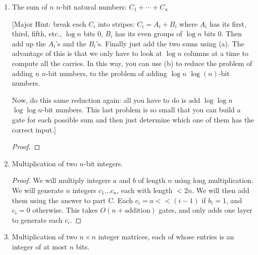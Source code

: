 \documentclass[12pt]{article}
\begin{document}
\begin{enumerate}
\begin{enumerate}
\begin{proof}
      Our second layer again has $n$ gates, $b_1...b_n$. Gate $b_i$ will be on if gate $a_i$ is on and $a_{i+1}$ is not on. There will be only one gate on at this level, $b_k$, where $k$ is the number of 1s in the input.

      Our final layer, $c_1...c_{\log{n}}$ will conver the number $k$ from $b_k$ to a binary value. Let $c_i=1$ if there is a $1$ in the $i^{\text{th}}$ position of $b_i$ and $b_i=1$. This takes a bunch of wires, but only a logarithmic number of gates.
    \end{proof}

  \item The sum of $n$ $n$-bit natural numbers: $C_1 + \cdots + C_n$

    [Major Hint: break each $C_i$ into stripes: $C_i = A_i + B_i$ where $A_i$
      has its first, third, fifth, etc.,  $\log n$ bits 0, $B_i$ has its even
      groups of $\log n$ bits 0.  Then add up the $A_i$'s and the
      $B_i$'s.  Finally just add the two sums using (a). The advantage of this is
      that we only have to look at $\log n$ columns at a time to compute all the
      carries.  In this way, you can use (b) to  reduce the problem of adding $n$ $n$-bit
      numbers, to the problem of adding $\log n$ $\log(n)$-bit numbers.

      Now, do this same reduction again: all you have to do is add $\log \log n$
      $\log \log n$-bit numbers.  This last problem is so small that you can
      build a gate for each possible sum and then just determine which one of
      them has the correct input.]

    \begin{proof}
    \end{proof}

  \item Multiplication of two $n$-bit integers.

    \begin{proof}
      We will multiply integers $a$ and $b$ of length $n$ using long multiplication. We will generate $n$ integers $c_1...c_n$, each with length $< 2n$. We will then add them using the answer to part C. Each $c_i = a << (i-1)$ if $b_i = 1$, and $c_i = 0$ otherwise. This takes $O(n + \text{addition})$ gates, and only adds one layer to generate each $c_i$.
    \end{proof}

  \item Multiplication of two $n\times n$ integer matrices, each of whose
    entries is an integer of at most $n$ bits.


\end{enumerate}
\end{enumerate}
\end{document}
